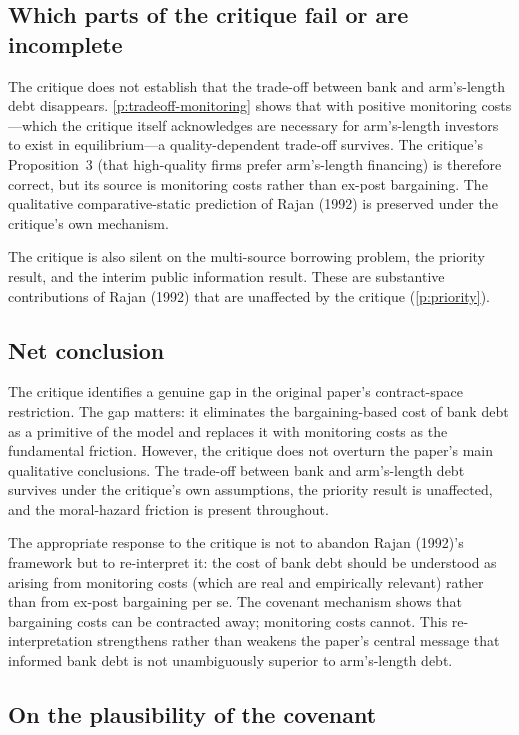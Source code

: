 \documentclass[12pt,a4paper]{article}
\theoremstyle{plain}
\theoremstyle{definition}
\theoremstyle{remark}
\begin{document}
\subsection{Which parts of the critique fail or are incomplete}

The critique does not establish that the trade-off between bank and arm's-length debt disappears. \cref{p:tradeoff-monitoring} shows that with positive monitoring costs---which the critique itself acknowledges are necessary for arm's-length investors to exist in equilibrium---a quality-dependent trade-off survives. The critique's Proposition~3 (that high-quality firms prefer arm's-length financing) is therefore correct, but its source is monitoring costs rather than ex-post bargaining. The qualitative comparative-static prediction of Rajan (1992) is preserved under the critique's own mechanism.

The critique is also silent on the multi-source borrowing problem, the priority result, and the interim public information result. These are substantive contributions of Rajan (1992) that are unaffected by the critique (\cref{p:priority}).

\subsection{Net conclusion}

The critique identifies a genuine gap in the original paper's contract-space restriction. The gap matters: it eliminates the bargaining-based cost of bank debt as a primitive of the model and replaces it with monitoring costs as the fundamental friction. However, the critique does not overturn the paper's main qualitative conclusions. The trade-off between bank and arm's-length debt survives under the critique's own assumptions, the priority result is unaffected, and the moral-hazard friction is present throughout.

The appropriate response to the critique is not to abandon Rajan (1992)'s framework but to re-interpret it: the cost of bank debt should be understood as arising from monitoring costs (which are real and empirically relevant) rather than from ex-post bargaining per se. The covenant mechanism shows that bargaining costs can be contracted away; monitoring costs cannot. This re-interpretation strengthens rather than weakens the paper's central message that informed bank debt is not unambiguously superior to arm's-length debt.

\subsection{On the plausibility of the covenant}
\end{document}
